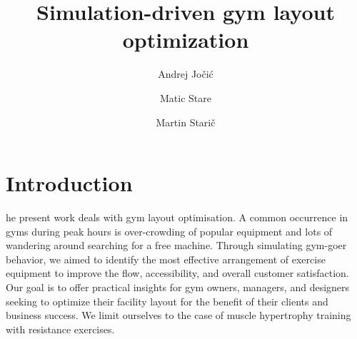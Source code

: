 \documentclass[9pt]{pnas-new}
\title{Simulation-driven gym layout optimization}
\author{Andrej Jočić}
\author{Matic Stare}
\author{Martin Starič}
\affil{Collective behaviour course research seminar report}
\begin{document}
\verticaladjustment{-2pt}

\maketitle
\thispagestyle{firststyle}

\section*{Introduction}
he present work deals with gym layout optimisation.
A common occurrence in gyms during peak hours is over-crowding of popular equipment and lots of wandering around searching for a free machine.
Through simulating gym-goer behavior, we aimed to identify the most effective arrangement of exercise equipment to improve the flow, accessibility, and overall customer satisfaction.
Our goal is to offer practical insights for gym owners, managers, and designers seeking to optimize their facility layout for the benefit of their clients and business success.
We limit ourselves to the case of muscle hypertrophy training with resistance exercises.
\end{document}
